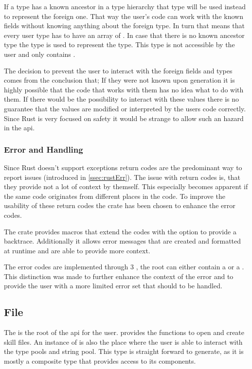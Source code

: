 \documentclass[thesis]{subfiles}
\begin{document}
      If a type has a known ancestor in a type hierarchy that type will be used instead to represent the foreign one.
      That way the user's code can work with the known fields without knowing anything about the foreign type.
      In turn that means that every user type has to have an array of \ForeignFieldData.
      In case that there is no known ancestor type the \Foreign type is used to represent the type.
      This type is not accessible by the user and only contains \ForeignFieldData.

      The decision to prevent the user to interact with the foreign fields and types comes from the conclusion that;
      If they were not known upon generation it is highly possible that the code that works with them has no idea what to do with them.
      If there would be the possibility to interact with these values there is no guarantee that the values are modified or interpreted by the users code correctly.
      Since Rust is very focused on safety it would be strange to allow such an hazard in the \gls{api}.

    \subsubsection{Error and Handling}
      Since Rust doesn't support exceptions return codes are the predominant way to report issues (introduced in \autoref{ssec:rustErr}).
      The issue with return codes is, that they provide not a lot of context by themself.
      This especially becomes apparent if the same code originates from different places in the code.
      To improve the usability of these return codes the  crate\autocite{rust-failure} has been chosen to enhance the error codes.

      The crate provides macros that extend the codes with the option to provide a backtrace.
      Additionally it allows error messages that are created and formatted at runtime and are able to provide more context.

      The error codes are implemented through 3 \enums, the root \enum can either contain a  or a .
      This distinction was made to further enhance the context of the error and to provide the user with a more limited error set that should to be handled.

  \subsection{ File}
    The \SkillFile is the root of the \gls{api} for the user.
    \SkillFile provides the functions to open and create \gls{skill} files.
    An instance of \SkillFile is also the place where the user is able to interact with the type pools and string pool.
    This type is straight forward to generate, as it is mostly a composite type that provides access to its components.
\end{document}
